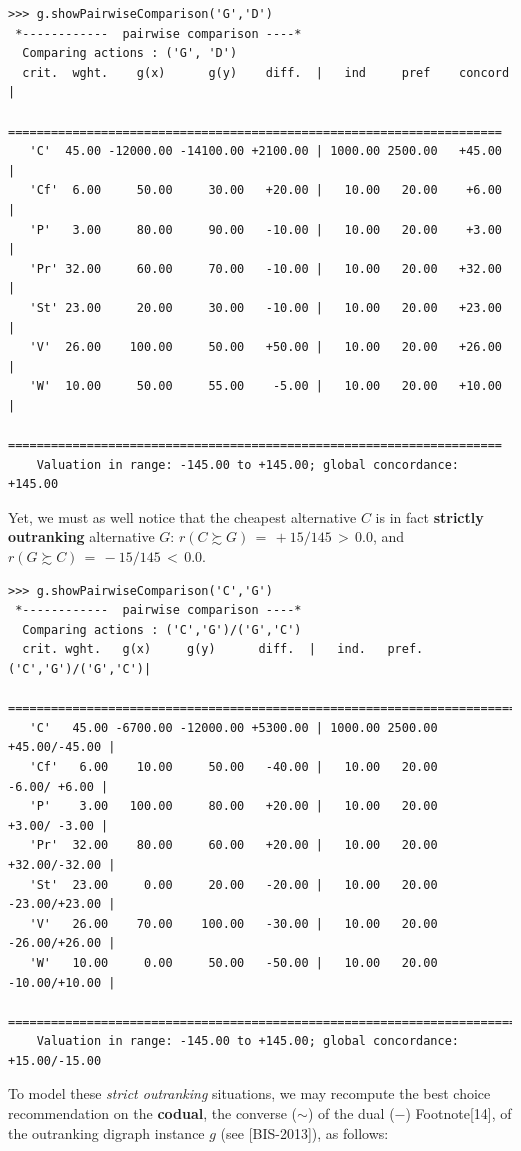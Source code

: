 \begin{lstlisting}[caption={Inspecting pairwise comparisons},label=list:6.5]
>>> g.showPairwiseComparison('G','D')
 *------------  pairwise comparison ----*
  Comparing actions : ('G', 'D')
  crit.  wght.    g(x)      g(y)    diff.  |   ind     pref    concord 	|
   =====================================================================
   'C'  45.00 -12000.00 -14100.00 +2100.00 | 1000.00 2500.00   +45.00 	| 
   'Cf'  6.00     50.00     30.00   +20.00 |   10.00   20.00    +6.00 	| 
   'P'   3.00     80.00     90.00   -10.00 |   10.00   20.00    +3.00 	| 
   'Pr' 32.00     60.00     70.00   -10.00 |   10.00   20.00   +32.00 	| 
   'St' 23.00     20.00     30.00   -10.00 |   10.00   20.00   +23.00 	| 
   'V'  26.00    100.00     50.00   +50.00 |   10.00   20.00   +26.00 	| 
   'W'  10.00     50.00     55.00    -5.00 |   10.00   20.00   +10.00 	|
   =====================================================================
    Valuation in range: -145.00 to +145.00; global concordance: +145.00
\end{lstlisting}

Yet, we must as well notice that the cheapest alternative $C$ is in fact \textbf{strictly outranking} alternative $G$:  $r(C \succsim G)\, =\, +15/145\, >\, 0.0$, and $r(G \succsim C)\, =\, -15/145 \,<\, 0.0$.

\begin{lstlisting}
>>> g.showPairwiseComparison('C','G')
 *------------  pairwise comparison ----*
  Comparing actions : ('C','G')/('G','C')
  crit. wght.   g(x)     g(y)      diff.  |   ind.   pref. ('C','G')/('G','C')|
   ===========================================================================
   'C'   45.00 -6700.00 -12000.00 +5300.00 | 1000.00 2500.00    +45.00/-45.00 | 
   'Cf'   6.00    10.00     50.00   -40.00 |   10.00   20.00     -6.00/ +6.00 | 
   'P'    3.00   100.00     80.00   +20.00 |   10.00   20.00     +3.00/ -3.00 | 
   'Pr'  32.00    80.00     60.00   +20.00 |   10.00   20.00    +32.00/-32.00 | 
   'St'  23.00     0.00     20.00   -20.00 |   10.00   20.00    -23.00/+23.00 | 
   'V'   26.00    70.00    100.00   -30.00 |   10.00   20.00    -26.00/+26.00 | 
   'W'   10.00     0.00     50.00   -50.00 |   10.00   20.00    -10.00/+10.00 |
   ===========================================================================
    Valuation in range: -145.00 to +145.00; global concordance: +15.00/-15.00
\end{lstlisting}
  
To model these \emph{strict outranking} situations, we may recompute the best choice recommendation on the \textbf{codual}, the converse ($\sim$) of the dual ($-$) Footnote[14], of the outranking digraph instance $g$ (see [BIS-2013]), as follows:

